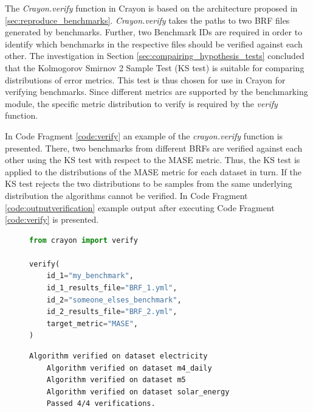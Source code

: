 The \textit{Crayon.verify} function in Crayon is based on the architecture proposed in \ref{sec:reproduce_benchmarks}. \textit{Crayon.verify} takes the paths to two BRF files generated by benchmarks. Further, two Benchmark IDs are required in order to identify which benchmarks in the respective files should be verified against each other. The investigation in Section \ref{sec:compairing_hypothesis_tests} concluded that the Kolmogorov Smirnov 2 Sample Test (KS test) is suitable for comparing distributions of error metrics. This test is thus chosen for use in Crayon for verifying benchmarks. Since different metrics are supported by the benchmarking module, the specific metric distribution to verify is required by the \textit{verify} function.

In Code Fragment \ref{code:verify} an example of the \textit{crayon.verify} function is presented. There, two benchmarks from different BRFs are verified against each other using the KS test with respect to the MASE metric. Thus, the KS test is applied to the distributions of the MASE metric for each dataset in turn. If the KS test rejects the two distributions to be samples from the same underlying distribution the algorithms cannot be verified. In Code Fragment \ref{code:outputverification} example output after executing Code Fragment \ref{code:verify} is presented.

\begin{figure}
  \begin{lstlisting}[language=Python, label={code:verify}, caption={Verifying whether two benchmarks are performed by the same algorithm.}]
from crayon import verify

verify(
    id_1="my_benchmark",
    id_1_results_file="BRF_1.yml", 
    id_2="someone_elses_benchmark",
    id_2_results_file="BRF_2.yml",
    target_metric="MASE",
)
\end{lstlisting}
\end{figure}
\begin{figure}
  \begin{lstlisting}[language=bash, label={code:outputverification}, caption={Output from Code Fragment \ref{code:verify}}]
    Algorithm verified on dataset electricity
    Algorithm verified on dataset m4_daily
    Algorithm verified on dataset m5
    Algorithm verified on dataset solar_energy
    Passed 4/4 verifications.
\end{lstlisting}
\end{figure}

